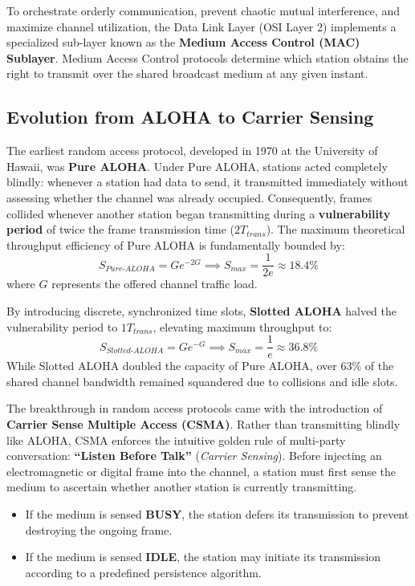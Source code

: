 \documentclass[12pt, a4paper]{article}
\begin{document}
To orchestrate orderly communication, prevent chaotic mutual interference, and maximize channel utilization, the Data Link Layer (OSI Layer 2) implements a specialized sub-layer known as the \textbf{Medium Access Control (MAC) Sublayer}. Medium Access Control protocols determine which station obtains the right to transmit over the shared broadcast medium at any given instant.

\subsection{Evolution from ALOHA to Carrier Sensing}
The earliest random access protocol, developed in 1970 at the University of Hawaii, was \textbf{Pure ALOHA}. Under Pure ALOHA, stations acted completely blindly: whenever a station had data to send, it transmitted immediately without assessing whether the channel was already occupied. Consequently, frames collided whenever another station began transmitting during a \textbf{vulnerability period} of twice the frame transmission time ($2 T_{trans}$). The maximum theoretical throughput efficiency of Pure ALOHA is fundamentally bounded by:
\begin{equation}
    S_{Pure\text{-}ALOHA} = G e^{-2G} \implies S_{max} = \frac{1}{2e} \approx 18.4\%
\end{equation}
where $G$ represents the offered channel traffic load. 

By introducing discrete, synchronized time slots, \textbf{Slotted ALOHA} halved the vulnerability period to $1 T_{trans}$, elevating maximum throughput to:
\begin{equation}
    S_{Slotted\text{-}ALOHA} = G e^{-G} \implies S_{max} = \frac{1}{e} \approx 36.8\%
\end{equation}
While Slotted ALOHA doubled the capacity of Pure ALOHA, over $63\%$ of the shared channel bandwidth remained squandered due to collisions and idle slots.

The breakthrough in random access protocols came with the introduction of \textbf{Carrier Sense Multiple Access (CSMA)}. Rather than transmitting blindly like ALOHA, CSMA enforces the intuitive golden rule of multi-party conversation: \textbf{``Listen Before Talk''} (\textit{Carrier Sensing}). Before injecting an electromagnetic or digital frame into the channel, a station must first sense the medium to ascertain whether another station is currently transmitting.
\begin{itemize}
    \item If the medium is sensed \textbf{BUSY}, the station defers its transmission to prevent destroying the ongoing frame.
    \item If the medium is sensed \textbf{IDLE}, the station may initiate its transmission according to a predefined persistence algorithm.
\end{itemize}
\end{document}
